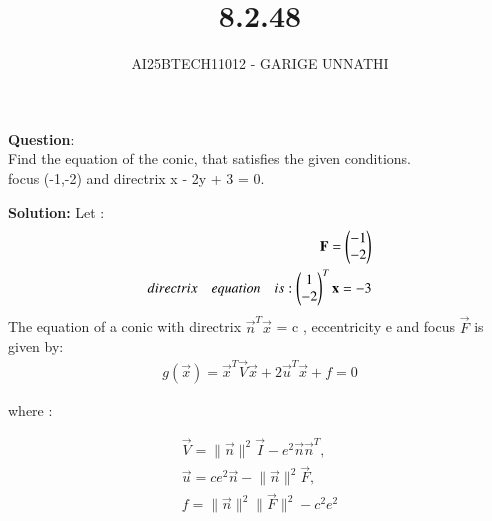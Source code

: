 \documentclass[journal]{IEEEtran}
\begin{document}

\vspace{3cm}

\title{8.2.48}
\author{AI25BTECH11012 - GARIGE UNNATHI}
{\let\newpage\relax\maketitle}


\renewcommand{\thefigure}{\theenumi}
\renewcommand{\thetable}{\theenumi}
\setlength{\intextsep}{10pt} %


\renewcommand{\thetable}{\theenumi}


\textbf{Question}:\\
Find the equation of the conic, that satisfies the given conditions. \\ 
focus (-1,-2) and directrix x - 2y + 3 = 0.
 
\textbf{Solution: }
Let :
\begin{align}
    \mathbf{F} = \begin{pmatrix}-1\\-2\end{pmatrix}\\
    directrix \quad equation \quad is : \begin{pmatrix}1\\-2\end{pmatrix}^{T}\mathbf{x} = -3
\end{align}
The equation of a conic with directrix $\vec{n}^{T}$$\vec{x}$ = c , eccentricity e and focus $\vec{F}$ is given by:
\begin{align}
    g(\vec{x}) = \vec{x}^{T}\vec{V}\vec{x} + 2\vec{u}^{T}\vec{x} + f  = 0
\end{align}

where :

\begin{align*}
\vec{V} = \lVert \vec{n} \rVert^{2}\vec{I} - e^{2}\vec{n}\vec{n}^{T} , \\
\vec{u} = ce^{2}\vec{n} - \lVert \vec{n} \rVert^{2}\vec{F} , \\
f = \lVert \vec{n} \rVert^{2}\lVert \vec{F} \rVert^{2} - c^{2}e^{2}
\end{align*}
\end{document}
